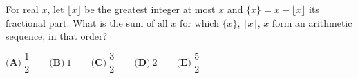 For real $x$, let $\lfloor x\rfloor$ be the greatest integer at most $x$ and $\{x\}=x-\lfloor x\rfloor$ its fractional part. What is the sum of all $x$ for which $\{x\}$, $\lfloor x\rfloor$, $x$ form an arithmetic sequence, in that order?

$\textbf{(A)}\ \dfrac12\qquad\textbf{(B)}\ 1\qquad\textbf{(C)}\ \dfrac32\qquad\textbf{(D)}\ 2\qquad\textbf{(E)}\ \dfrac52$
